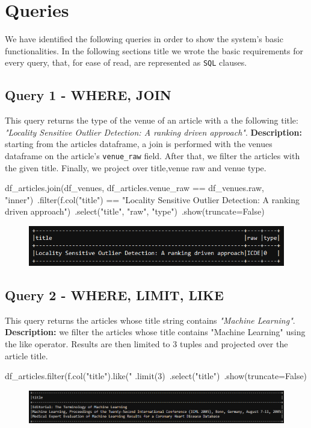 \documentclass{Configuration_Files/PoliMi3i_thesis}
\begin{document}
\newpage
\section{Queries}
We have identified the following queries in order to show the system's basic functionalities.\newline
In the following sections title we wrote the basic requirements for every query, that, for ease of read, are represented
as \verb |SQL| clauses.

\subsection{Query 1 - WHERE, JOIN}
This query returns the type of the venue of an article with a the following title: \emph{"Locality Sensitive Outlier Detection:
A ranking driven approach"}.\newline
\textbf{Description:} starting from the articles dataframe, a join is performed with the venues dataframe on the article's
\verb|venue_raw| field. After that, we filter the articles with the given title. Finally, we project over title,venue raw and venue type.\newline
\begin{python}
df_articles.join(df_venues, df_articles.venue_raw == df_venues.raw, "inner")\
           .filter(f.col("title") == "Locality Sensitive Outlier Detection: A ranking driven approach")\
           .select("title", "raw", "type")\
           .show(truncate=False)
\end{python}
\begin{figure}[H]
\centering
\includegraphics[width=1\textwidth]{query/spark_q1.PNG}
\label{fig:query1}
\end{figure}

\subsection{Query 2 - WHERE, LIMIT, LIKE}
This query returns the articles whose title string contains \emph{"Machine Learning"}.\newline
\textbf{Description:} we filter the articles whose title contains "Machine Learning" using the like operator. Results are then limited
to 3 tuples and projected over the article title.\newline
\begin{python}
df_articles.filter(f.col("title").like("%
           .limit(3)\
           .select("title")\
           .show(truncate=False)
\end{python}
\begin{figure}[H]
\centering
\includegraphics[width=1\textwidth]{query/spark_q2.PNG}
\label{fig:query2}
\end{figure}
\end{document}
